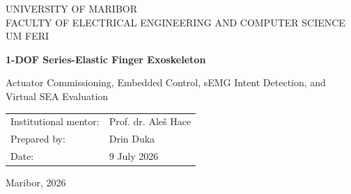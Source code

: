 \documentclass[11pt,a4paper]{report}
\begin{document}
\begin{titlepage}
\centering
{\large UNIVERSITY OF MARIBOR\\FACULTY OF ELECTRICAL ENGINEERING AND COMPUTER SCIENCE\\UM FERI\par}
\vspace{2.5cm}
{\Huge\bfseries 1-DOF Series-Elastic Finger Exoskeleton\par}
\vspace{0.4cm}
{\Large Actuator Commissioning, Embedded Control, sEMG Intent Detection, and Virtual SEA Evaluation\par}
\vfill
\begin{tabular}{ll}
Institutional mentor: & Prof. dr. Ale\v{s} Hace\\
Prepared by: & Drin Duka\\
Date: & 9 July 2026
\end{tabular}
\vfill
{Maribor, 2026\par}
\end{titlepage}

\begin{abstract}
This project investigated a one-degree-of-freedom series-elastic-actuated (SEA) finger exoskeleton for surface-electromyography (sEMG) intent detection and later sensorimotor analysis. The available Harmonic Drive PMA-8A actuator, Maxon ESCON 50/5 controller, incremental encoder, and STM32 NUCLEO-F446RE were commissioned. Closed-loop low-speed rotation was first verified using the ESCON potentiometer and then commanded by STM32 analog and digital outputs. A laptop bridge was implemented to acquire eight-channel Myo armband EMG and inertial data, calibrate a repeatable pinch-intent template, reject competing gestures and motion, log trials, and communicate with the STM32 over serial.

The physical spring, tendon transmission, finger mechanism, and spring-deflection sensor were unavailable and therefore were not represented as completed hardware. Instead, recorded real EMG classification was replayed through an explicitly labelled virtual SEA model to demonstrate the intended bounded $0$--$180^\circ$ motion and the relationship between spring deflection and force. The result is a validated physical actuator-and-embedded-control MVP, a separately validated sEMG intent subsystem, and a reproducible simulation of the missing compliant mechanism. Physical Myo-to-actuator operation, impedance control, and electromechanical-delay measurement remain future integration work.
\end{abstract}
\end{document}
